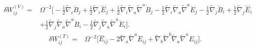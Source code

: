 \documentclass[10pt,letterpaper]{article}
\begin{document}
\begin{align}
\delta W_{ij}^{(V)}={}&\Omega^{-2}\big[- \tfrac{1}{2} \tilde{\nabla}_{i}\dddot{B}_{j}
 + \tfrac{1}{2} \tilde{\nabla}_{i}\overset{\text{...}.}{E}_{j}
 + \tfrac{1}{2} \tilde{\nabla}_{i}\tilde{\nabla}_{a}\tilde{\nabla}^{a}\dot{B}_{j}
 -  \tfrac{1}{2} \tilde{\nabla}_{i}\tilde{\nabla}_{a}\tilde{\nabla}^{a}\ddot{E}_{j}
 -  \tfrac{1}{2} \tilde{\nabla}_{j}\dddot{B}_{i}
 + \tfrac{1}{2} \tilde{\nabla}_{j}\overset{\text{...}.}{E}_{i}\nonumber\\
& + \tfrac{1}{2} \tilde{\nabla}_{j}\tilde{\nabla}_{a}\tilde{\nabla}^{a}\dot{B}_{i}
 -  \tfrac{1}{2} \tilde{\nabla}_{j}\tilde{\nabla}_{a}\tilde{\nabla}^{a}\ddot{E}_{i}\big].
\end{align}
\begin{align}
\delta W_{ij}^{(T)}={}&\Omega^{-2}\big[\overset{\text{...}.}{E}_{ij}
 - 2 \tilde{\nabla}_{a}\tilde{\nabla}^{a}\ddot{E}_{ij}
 + \tilde{\nabla}_{b}\tilde{\nabla}^{b}\tilde{\nabla}_{a}\tilde{\nabla}^{a}E_{ij}\big].
\end{align}
\end{document}
